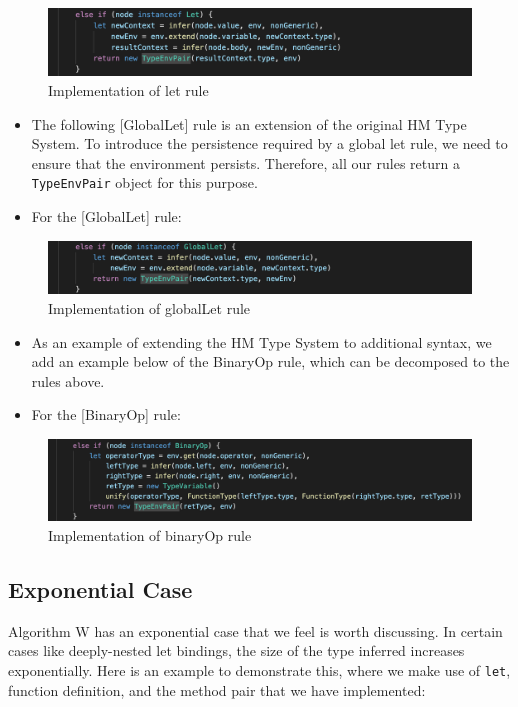   \begin{figure}[H]
      \centering
      \includegraphics[width=0.8\linewidth]{images/let.png}
      \caption{Implementation of let rule}
      \label{fig:letrule}
  \end{figure}
  \begin{itemize}
    \item The following [GlobalLet] rule is an extension of the original HM Type System. To introduce the persistence required by a global let rule, we need to ensure that the environment persists. Therefore, all our rules return a \verb#TypeEnvPair# object for this purpose.
    \item For the [GlobalLet] rule:
  \end{itemize}
  \begin{figure}[H]
      \centering
      \includegraphics[width=0.8\linewidth]{images/globalLet.png}
      \caption{Implementation of globalLet rule}
      \label{fig:globalLetrule}
  \end{figure}
  \begin{itemize}
    \item As an example of extending the HM Type System to additional syntax, we add an example below of the BinaryOp rule, which can be decomposed to the rules above.
    \item For the [BinaryOp] rule:
  \end{itemize}
  \begin{figure}[H]
      \centering
      \includegraphics[width=0.8\linewidth]{images/binaryOp.png}
      \caption{Implementation of binaryOp rule}
      \label{fig:binaryOprule}
  \end{figure}
  
\subsection{Exponential Case}
Algorithm W has an exponential case that we feel is worth discussing. In certain cases like deeply-nested let bindings, the size of the type inferred increases exponentially. Here is an example to demonstrate this, where we make use of \verb|let|, function definition, and the method pair that we have implemented:

